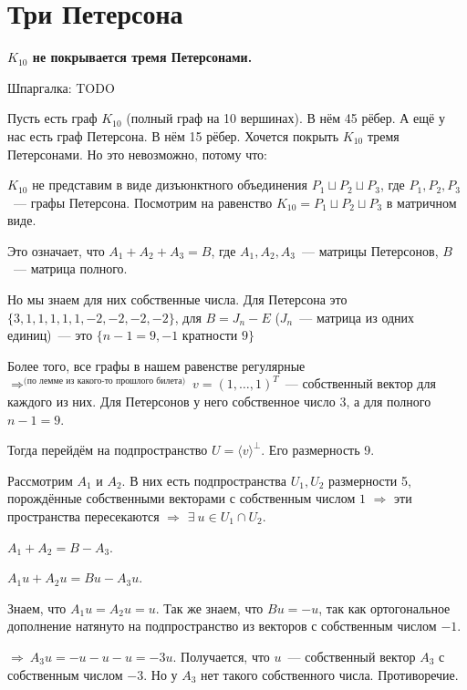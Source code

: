 \section{
 Три Петерсона %
}

\textbf{$K_{10}$ не покрывается тремя Петерсонами.}


Шпаргалка: TODO

Пусть есть граф $K_{10}$ (полный граф на 10 вершинах). В нём 45 рёбер. А ещё у нас есть граф Петерсона. В нём 15 рёбер. Хочется покрыть $K_{10}$ тремя Петерсонами. Но это невозможно, потому что:

\thrm $K_{10}$ не представим в виде дизъюнктного объединения $P_1\sqcup P_2\sqcup P_3$, где $P_1, P_2, P_3$~--- графы Петерсона.
	\proof
	Посмотрим на равенство $K_{10} = P_1 \sqcup P_2\sqcup P_3$ в матричном виде.

	Это означает, что $A_1 + A_2 + A_3 = B$, где $A_1, A_2, A_3$~--- матрицы Петерсонов, $B$~--- матрица полного.

	Но мы знаем для них собственные числа. Для Петерсона это $\{3, 1, 1, 1, 1, 1, -2, -2, -2, -2\}$, для $B = J_n - E$ ($J_n$~--- матрица из одних единиц)~--- это $\{n - 1 = 9, -1\text{ кратности 9}\}$

	Более того, все графы в нашем равенстве регулярные $\Rightarrow^{\text{(по лемме из какого-то прошлого билета)}}\ v=(1,\ldots, 1)^T$~--- собственный вектор для каждого из них. Для Петерсонов у него собственное число $3$, а для полного $n - 1 = 9$. 

	Тогда перейдём на подпространство $U = \langle v\rangle^{\perp}$. Его размерность 9.

	Рассмотрим $A_1$ и $A_2$. В них есть подпространства $U_1, U_2$ размерности 5, порождённые собственными векторами с собственным числом $1$ $\Rightarrow$ эти пространства пересекаются $\Rightarrow$ $\exists\ u\in U_1 \cap U_2$.

	$A_1 + A_2 = B - A_3$.

	$A_1u + A_2u = Bu - A_3u$.

	Знаем, что $A_1u = A_2u = u$. Так же знаем, что $Bu = -u$, так как ортогональное дополнение натянуто на подпространство из векторов с собственным числом $-1$.

	$\Rightarrow\ A_3u = -u-u-u = -3u$. Получается, что $u$~--- собственный вектор $A_3$ с собственным числом $-3$. Но у $A_3$ нет такого собственного числа. Противоречие. 
\endproof
\ethrm 
